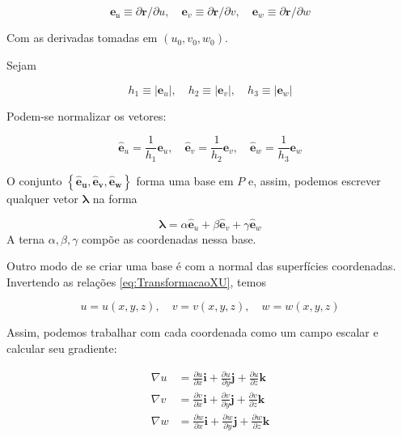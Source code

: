 \begin{equation}\label{eq:VetoresCoordenadosU}
\boxed{\mathbf{e}_{\mathfrak{u}} \equiv \partial \mathbf{r} / \partial u, \quad \mathbf{e}_{v} \equiv \partial \mathbf{r} / \partial v, \quad \mathbf{e}_{w} \equiv \partial \mathbf{r} / \partial w}
\end{equation}


Com as derivadas tomadas em $ (u_0,v_0,w_0) $.

Sejam 

\[
h_{1} \equiv\left|\mathbf{e}_{u}\right|, \quad h_{2} \equiv\left|\mathbf{e}_{v}\right|, \quad h_{3} \equiv\left|\mathbf{e}_{w}\right|
\]

Podem-se normalizar os vetores:

\[
\hat{\mathbf{e}}_{u}=\frac{1}{h_{1}} \mathbf{e}_{u}, \quad \mathbf{\hat { e }}_{v}=\frac{1}{h_{2}} \mathbf{e}_{v}, \quad \mathbf{\hat { e }}_{w}=\frac{1}{h_{3}} \mathbf{e}_{w}
\]

O conjunto $ \left\{\hat{\mathbf{e}}_{\boldsymbol{u}}, \mathbf{\hat { e }}_{\boldsymbol{v}}, \hat{\mathbf{e}}_{\boldsymbol{w}}\right\} $ forma uma base em $ P $ e, assim, podemos escrever qualquer vetor $ \mathbf{\lambda} $ na forma

\[
\boldsymbol{\lambda}=\alpha \hat{\mathbf{e}}_{u}+\beta \hat{\mathbf{e}}_{v}+\gamma \hat{\mathbf{e}}_{w}
\]
A terna $ \alpha,\beta,\gamma $ compõe as coordenadas nessa base.

Outro modo de se criar uma base é com a normal das superfícies coordenadas. Invertendo as relações 
\eqref{eq:TransformacaoXU}, temos

\begin{equation}\label{eq:TransformacaoUX}
u=u(x, y, z), \quad v=v(x, y, z), \quad w=w(x, y, z)
\end{equation}

Assim, podemos trabalhar com cada coordenada como um campo escalar e calcular seu gradiente:

\begin{equation}\label{eq:GradienteTransformacaoUX}
\begin{aligned} \nabla u &=\frac{\partial u}{\partial x} \mathbf{i}+\frac{\partial u}{\partial y} \mathbf{j}+\frac{\partial u}{\partial z} \mathbf{k} \\ \nabla v &=\frac{\partial v}{\partial x} \mathbf{i}+\frac{\partial v}{\partial y} \mathbf{j}+\frac{\partial v}{\partial z} \mathbf{k} \\ \nabla w &=\frac{\partial w}{\partial x} \mathbf{i}+\frac{\partial w}{\partial y} \mathbf{j}+\frac{\partial w}{\partial z} \mathbf{k} \end{aligned}
\end{equation}

